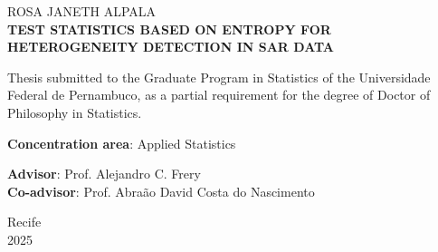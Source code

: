 \begin{titlepage}
  \thispagestyle{empty}
    \begin{center}
    {\large ROSA JANETH ALPALA}\\[4cm]
    {\Large \textbf{TEST STATISTICS BASED ON ENTROPY FOR HETEROGENEITY 
    DETECTION IN SAR DATA }}\\[4cm]
  \end{center}

  \noindent
  \hspace*{0.3\textwidth}
  \begin{minipage}{0.65\textwidth}
    Thesis submitted to the Graduate Program in Statistics of 
    the Universidade Federal de Pernambuco, as a partial requirement 
    for the degree of Doctor of Philosophy  in Statistics.
    
    \vspace{1em}
    \textbf{Concentration area}: Applied Statistics
    
    \vspace{2em} 
    \textbf{Advisor}: Prof. Alejandro C. Frery \\
    \textbf{Co-advisor}: Prof. Abraão David Costa do Nascimento
  \end{minipage}
  
  \vfill
  \begin{center}
    Recife\\
    2025
  \end{center}
\end{titlepage}


